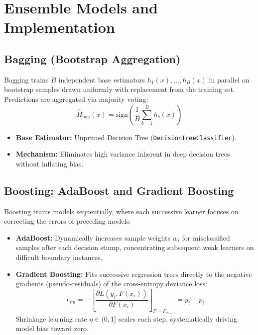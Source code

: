 \documentclass[12pt,a4paper]{article}
\begin{document}
\section{Ensemble Models and Implementation}

\subsection{Bagging (Bootstrap Aggregation)}
Bagging trains $B$ independent base estimators $h_1(x), \dots, h_B(x)$ in parallel on bootstrap samples drawn uniformly with replacement from the training set. Predictions are aggregated via majority voting:
\begin{equation}
\hat{H}_{\text{bag}}(x) = \text{sign}\left(\frac{1}{B}\sum_{b=1}^B h_b(x)\right)
\end{equation}
\begin{itemize}
\item \textbf{Base Estimator:} Unpruned Decision Tree (\texttt{DecisionTreeClassifier}).
\item \textbf{Mechanism:} Eliminates high variance inherent in deep decision trees without inflating bias.
\end{itemize}

\subsection{Boosting: AdaBoost and Gradient Boosting}
Boosting trains models sequentially, where each successive learner focuses on correcting the errors of preceding models:
\begin{itemize}
\item \textbf{AdaBoost:} Dynamically increases sample weights $w_i$ for misclassified samples after each decision stump, concentrating subsequent weak learners on difficult boundary instances.
\item \textbf{Gradient Boosting:} Fits successive regression trees directly to the negative gradients (pseudo-residuals) of the cross-entropy deviance loss:
\begin{equation}
r_{im} = -\left[\frac{\partial L(y_i, F(x_i))}{\partial F(x_i)}\right]_{F=F_{m-1}} = y_i - p_i
\end{equation}
Shrinkage learning rate $\eta \in (0, 1]$ scales each step, systematically driving model bias toward zero.
\end{itemize}
\end{document}
